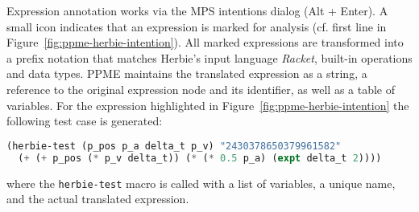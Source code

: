 % 
Expression annotation works via the MPS intentions dialog (Alt + Enter). 
A small icon indicates that an expression is marked for analysis (cf. first line in 
Figure~\ref{fig:ppme-herbie-intention}). 
All marked expressions are transformed into a prefix notation that matches Herbie's 
input language \emph{Racket}, built-in operations and data types.
PPME maintains the translated expression as a string, a reference to 
the original expression node and its identifier, as well as a table of variables. 
For the expression highlighted in Figure~\ref{fig:ppme-herbie-intention} the following test case is
generated:
%
\begin{lstlisting}[basicstyle=\footnotesize\ttfamily, language=lisp,morekeywords={herbie-test},numbers=none, framesep=0pt, rulesep=0pt, frame=none, mathescape=true]
(herbie-test (p_pos p_a delta_t p_v) "2430378650379961582"
  (+ (+ p_pos (* p_v delta_t)) (* (* 0.5 p_a) (expt delta_t 2))))
\end{lstlisting}
%
where the \texttt{herbie-test} macro is called with a list of variables, a unique name, and
the actual translated expression.

